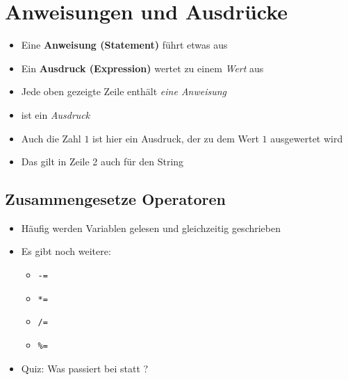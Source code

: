 

\section{Anweisungen und Ausdrücke}
\begin{frame}
    \slidehead
    \begin{itemize}
        \item Eine \textbf{Anweisung (Statement)} führt etwas aus
        \item Ein \textbf{Ausdruck (Expression)} wertet zu einem \textit{Wert} aus
    \end{itemize}
    \pause
    \begin{itemize}
        \item Jede oben gezeigte Zeile enthält \textit{eine Anweisung}
        \item {} ist ein \textit{Ausdruck}
            \pause
        \item Auch die Zahl $1$ ist hier ein Ausdruck, der zu dem Wert $1$ ausgewertet wird
        \item Das gilt in Zeile 2 auch für den String
    \end{itemize}

\end{frame}

\subsection{Zusammengesetze Operatoren}
\begin{frame}[fragile]
    \slidehead

    \begin{itemize}
        \item Häufig werden Variablen gelesen und gleichzeitig geschrieben
    \end{itemize}


    \begin{itemize}
        \item Es gibt noch weitere:
            \begin{itemize}
                \item \verb+-=+
                \item \verb+*=+
                \item \verb+/=+
                \item \verb+%=+
            \end{itemize}
            \pause
        \item Quiz: Was passiert bei  statt ?
    \end{itemize}
\end{frame}

